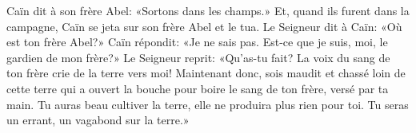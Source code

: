 Caïn dit à son frère Abel: «Sortons dans les champs.»
Et, quand ils furent dans la campagne,
	Caïn se jeta sur son frère Abel et le tua.
Le Seigneur dit à Caïn: «Où est ton frère Abel?»
Caïn répondit: «Je ne sais pas.
	Est-ce que je suis, moi, le gardien de mon frère?»
Le Seigneur reprit: «Qu’as-tu fait?
	La voix du sang de ton frère crie de la terre vers moi!
Maintenant donc, sois maudit et chassé loin de cette terre
	qui a ouvert la bouche pour boire le sang de ton frère, versé par ta main.
Tu auras beau cultiver la terre, elle ne produira plus rien pour toi.
	Tu seras un errant, un vagabond sur la terre.»
